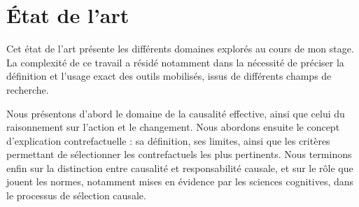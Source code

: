 \section{État de l'art}\label{sote}
Cet état de l'art présente les différents domaines explorés au cours de mon stage. La complexité de ce travail a résidé notamment dans la nécessité de préciser la définition et l'usage exact des outils mobilisés, issus de différents champs de recherche.


Nous présentons d'abord le domaine de la causalité effective, ainsi que celui du raisonnement sur l'action et le changement. Nous abordons ensuite le concept d'explication contrefactuelle : sa définition, ses limites, ainsi que les critères permettant de sélectionner les contrefactuels les plus pertinents. Nous terminons enfin sur la distinction entre causalité et responsabilité causale, et sur le rôle que jouent les normes, notamment mises en évidence par les sciences cognitives, dans le processus de sélection causale.


